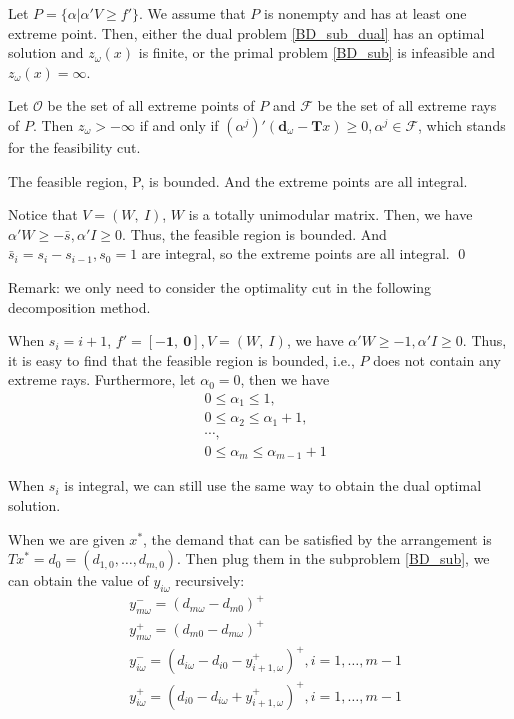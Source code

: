 Let $P = \{\alpha|\alpha{'}V \geq f{'}\}$. 
We assume that $P$ is nonempty and has at least one extreme point. Then, either the dual problem \eqref{BD_sub_dual} has an optimal solution and $z_{\omega}(x)$ is finite, or the primal problem \eqref{BD_sub} is infeasible and $z_{\omega}(x) = \infty$.  

Let $\mathcal{O}$ be the set of all extreme points of $P$ and $\mathcal{F}$ be the set of all extreme rays of $P$. Then $z_{\omega} > -\infty$ if and only if $(\alpha^{j}){'}(\mathbf{d}_{\omega}- \mathbf{T}x) \geq 0, \alpha^{j} \in \mathcal{F}$, which stands for the feasibility cut. 

\begin{thm}\label{feasible_region}
  The feasible region, P, is bounded. And the extreme points are all integral.
\end{thm}

\begin{pf}
Notice that $V =(W,~I)$, $W$ is a totally unimodular matrix. Then, we have $\alpha{'}W \geq -\bar{s}, \alpha{'}I \geq 0$. Thus, the feasible region is bounded.
And $\bar{s}_i = s_i - s_{i-1}, s_0 =1$ are integral, so the extreme points are all integral.
\qed
\end{pf}

Remark: we only need to consider the optimality cut in the following decomposition method.

When $s_i = i+1$, $f{'} = [-\mathbf{1},~\mathbf{0}], V =(W,~I)$, we have $\alpha{'}W \geq -1, \alpha{'}I \geq 0$. Thus, it is easy to find that the feasible region is bounded, i.e., $P$ does not contain any extreme rays. Furthermore, let $\alpha_0 = 0$, then we have 
\begin{align*}
  & 0 \leq \alpha_1 \leq 1,\\ 
  & 0 \leq \alpha_2 \leq \alpha_1 + 1, \\
  & \cdots, \\
  & 0 \leq \alpha_m \leq \alpha_{m-1} + 1
\end{align*}

When $s_i$ is integral, we can still use the same way to obtain the dual optimal solution.

When we are given $x^{*}$, the demand that can be satisfied by the arrangement is $T x^{*} = d_0 = (d_{1,0},\ldots,d_{m,0})$.
Then plug them in the subproblem \eqref{BD_sub}, we can obtain the value of $y_{i \omega}$ recursively:
\begin{equation}\label{y_recursively}
\begin{aligned}
  & y_{m \omega}^{-}=\left(d_{m \omega}-d_{m 0}\right)^{+} \\
  & y_{m \omega}^{+}=\left(d_{m 0}-d_{m \omega}\right)^{+} \\
  & y_{i \omega}^{-}=\left(d_{i \omega}-d_{i 0} - y_{i+1, \omega}^{+} \right)^{+}, i =1,\ldots,m-1 \\
  & y_{i \omega}^{+}=\left(d_{i 0}- d_{i \omega} + y_{i+1, \omega}^{+}\right)^{+}, i =1,\ldots,m-1
\end{aligned}
\end{equation}

